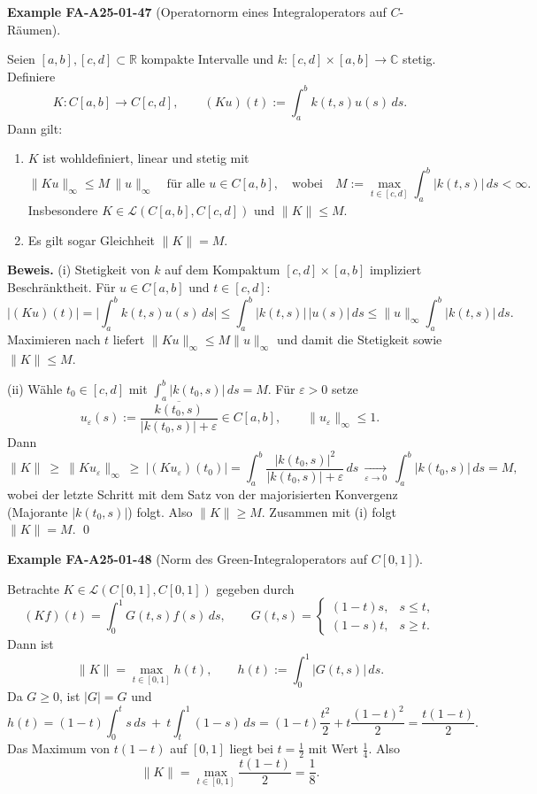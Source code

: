 \documentclass[10pt, letterpaper]{article}
\newcommand{\CustomHeading}[3]{%
  \par\medskip\noindent%
  \textbf{#1 #2} \textnormal{(#3)}.\enskip%
}
\newenvironment{EXA}[2]{\begin{unitbox}\CustomHeading{Example}{#1}{#2}}{\end{unitbox}}
\begin{document}
\begin{EXA}{FA-A25-01-47}{Operatornorm eines Integraloperators auf $C$-Räumen}
Seien $[a,b],[c,d]\subset\mathbb{R}$ kompakte Intervalle und $k:[c,d]\times[a,b]\to\mathbb{C}$ stetig. Definiere
\[
K:C[a,b]\longrightarrow C[c,d],\qquad (Ku)(t):=\int_a^b k(t,s)u(s)\,ds.
\]
Dann gilt:
\begin{enumerate}
\item[(i)] $K$ ist wohldefiniert, linear und stetig mit
\[
\|Ku\|_\infty \le M\,\|u\|_\infty\quad\text{für alle }u\in C[a,b],
\quad\text{wobei}\quad
M:=\max_{t\in[c,d]}\int_a^b |k(t,s)|\,ds<\infty.
\]
Insbesondere $K\in\mathcal{L}\!\left(C[a,b],C[c,d]\right)$ und $\|K\|\le M$.
\item[(ii)] Es gilt sogar Gleichheit $\|K\|=M$.
\end{enumerate}

\textbf{Beweis.}
(i) Stetigkeit von $k$ auf dem Kompaktum $[c,d]\times[a,b]$ impliziert Beschränktheit. Für $u\in C[a,b]$ und $t\in[c,d]$:
\[
|(Ku)(t)|=\Big|\int_a^b k(t,s)u(s)\,ds\Big|
\le \int_a^b |k(t,s)|\,|u(s)|\,ds
\le \|u\|_\infty \int_a^b |k(t,s)|\,ds.
\]
Maximieren nach $t$ liefert $\|Ku\|_\infty\le M\|u\|_\infty$ und damit die Stetigkeit sowie $\|K\|\le M$.

(ii) Wähle $t_0\in[c,d]$ mit $\int_a^b |k(t_0,s)|\,ds=M$. Für $\varepsilon>0$ setze
\[
u_\varepsilon(s):=\frac{\overline{k(t_0,s)}}{|k(t_0,s)|+\varepsilon}\in C[a,b],
\qquad \|u_\varepsilon\|_\infty\le 1.
\]
Dann
\[
\|K\|\ \ge\ \|Ku_\varepsilon\|_\infty\ \ge\ |(Ku_\varepsilon)(t_0)|
=\int_a^b \frac{|k(t_0,s)|^2}{|k(t_0,s)|+\varepsilon}\,ds
\ \xrightarrow[\varepsilon\to 0]{}\ \int_a^b |k(t_0,s)|\,ds=M,
\]
wobei der letzte Schritt mit dem Satz von der majorisierten Konvergenz (Majorante $|k(t_0,s)|$) folgt. Also $\|K\|\ge M$. Zusammen mit (i) folgt $\|K\|=M$. \qed
\end{EXA}



\begin{EXA}{FA-A25-01-48}{Norm des Green-Integraloperators auf $C[0,1]$}
Betrachte $K\in\mathcal{L}(C[0,1],C[0,1])$ gegeben durch
\[
(Kf)(t)=\int_0^1 G(t,s)f(s)\,ds,\qquad
G(t,s)=\begin{cases}(1-t)s,& s\le t,\\ (1-s)t,& s\ge t.\end{cases}
\]
Dann ist
\[
\|K\|=\max_{t\in[0,1]} h(t),\qquad
h(t):=\int_0^1 |G(t,s)|\,ds.
\]
Da $G\ge 0$, ist $|G|=G$ und
\[
h(t)=(1-t)\int_0^t s\,ds\ +\ t\int_t^1(1-s)\,ds
=(1-t)\frac{t^2}{2}+t\frac{(1-t)^2}{2}
=\frac{t(1-t)}{2}.
\]
Das Maximum von $t(1-t)$ auf $[0,1]$ liegt bei $t=\tfrac12$ mit Wert $\tfrac14$. Also
\[
\|K\|=\max_{t\in[0,1]}\frac{t(1-t)}{2}=\frac{1}{8}.
\]
\end{EXA}
\end{document}
